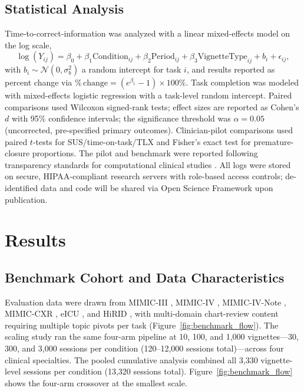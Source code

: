 \documentclass[11pt]{article}
\begin{document}
\subsection{Statistical Analysis}
\label{sec:stats}

Time-to-correct-information was analyzed with a linear mixed-effects model on the log scale,
\begin{equation}
\log(Y_{ij}) = \beta_0 + \beta_1 \mathrm{Condition}_{ij} + \beta_2 \mathrm{Period}_{ij} + \beta_3 \mathrm{VignetteType}_{ij} + b_i + \epsilon_{ij},
\label{eq:lme}
\end{equation}
with $b_i \sim \mathcal{N}(0,\sigma_b^2)$ a random intercept for task $i$, and results reported as percent change via $\%\,\mathrm{change} = (e^{\beta_1}-1)\times 100\%$. Task completion was modeled with mixed-effects logistic regression with a task-level random intercept. Paired comparisons used Wilcoxon signed-rank tests; effect sizes are reported as Cohen's $d$ with 95\% confidence intervals; the significance threshold was $\alpha=0.05$ (uncorrected, pre-specified primary outcomes). Clinician-pilot comparisons used paired $t$-tests for SUS/time-on-task/TLX and Fisher's exact test for premature-closure proportions. The pilot and benchmark were reported following transparency standards for computational clinical studies \citep{moher09}. All logs were stored on secure, HIPAA-compliant research servers with role-based access controls; de-identified data and code will be shared via Open Science Framework upon publication.

\section{Results}
\label{sec:results}

\subsection{Benchmark Cohort and Data Characteristics}
\label{sec:benchmark}

Evaluation data were drawn from MIMIC-III \citep{johnson2016_mimic3}, MIMIC-IV \citep{pollard2018_mimic4}, MIMIC-IV-Note \citep{johnson2023_mimiciv_note}, MIMIC-CXR \citep{johnson2019_mimic_cxr}, eICU \citep{pollard2018_eicu}, and HiRID \citep{muller2021_hirid}, with multi-domain chart-review content requiring multiple topic pivots per task (Figure~\ref{fig:benchmark_flow}). The scaling study ran the same four-arm pipeline at 10, 100, and 1{,}000 vignettes---30, 300, and 3{,}000 sessions per condition (120--12{,}000 sessions total)---across four clinical specialties. The pooled cumulative analysis combined all 3{,}330 vignette-level sessions per condition (13{,}320 sessions total). Figure~\ref{fig:benchmark_flow} shows the four-arm crossover at the smallest scale.
\end{document}

